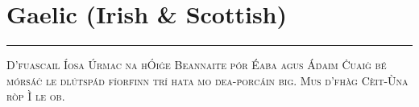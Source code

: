 \vspace{-1em}\section*{\checkno Gaelic (Irish \& Scottish)}
\vspace{-.5em}\hrule\vspace{.5em}
\noindent\textsc{
D’ḟuascail Íosa Úrṁac na hÓiġe Beannaiṫe pór Éaḃa agus Áḋaiṁ
Ċuaiġ bé ṁórṡáċ le dlúṫspád fíorḟinn trí hata mo ḋea-ṗorcáin ḃig.
Mus d’fhàg Cèit-Ùna ròp Ì le ob.
}